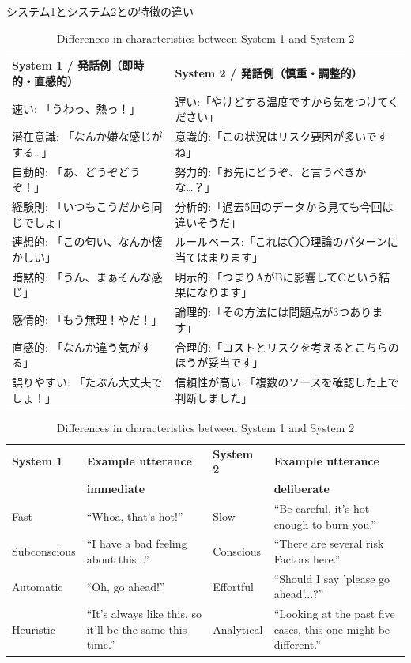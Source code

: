 \documentclass[a4paper,xelatex,ja=standard]{bxjsarticle}
\begin{document}
\begin{table}[htb]\centering\small
\ifJPN
\caption{システム1とシステム2との特徴の違い}
\else
\caption{Differences in characteristics between System 1 and System 2}
\fi
\label{tab:system1-system2}
\ifJPN
\toprule
\begin{tabular}{@{}ll@{}}
\textbf{System 1} / \textbf{発話例（即時的・直感的）} & \textbf{System 2} / \textbf{発話例（慎重・調整的）} \\
\midrule
速い: 「うわっ、熱っ！」 & 遅い:「やけどする温度ですから気をつけてください」 \\
潜在意識: 「なんか嫌な感じがする…」 & 意識的:「この状況はリスク要因が多いですね」 \\
自動的: 「あ、どうぞどうぞ！」 & 努力的:「お先にどうぞ、と言うべきかな…？」 \\
経験則: 「いつもこうだから同じでしょ」 & 分析的:「過去5回のデータから見ても今回は違いそうだ」 \\
連想的: 「この匂い、なんか懐かしい」 & ルールベース:「これは〇〇理論のパターンに当てはまります」 \\
暗黙的: 「うん、まぁそんな感じ」 & 明示的:「つまりAがBに影響してCという結果になります」 \\
感情的: 「もう無理！やだ！」 & 論理的:「その方法には問題点が3つあります」 \\
直感的: 「なんか違う気がする」 & 合理的:「コストとリスクを考えるとこちらのほうが妥当です」 \\
誤りやすい: 「たぶん大丈夫でしょ！」 & 信頼性が高い:「複数のソースを確認した上で判断しました」 \\
\end{tabular}
\else
\begin{tabular}{@{}lp{50mm}lp{60mm}@{}}
\toprule
\textbf{System 1} & \textbf{Example utterance } & \textbf{System 2} & \textbf{Example utterance} \\
& \textbf{immediate} & & \textbf{deliberate} \\
\midrule
Fast& ``Whoa, that's hot!'' & Slow& ``Be careful, it's hot enough to burn you.'' \\
Subconscious& ``I have a bad feeling about this...'' & Conscious& ``There are several risk Factors here.'' \\
Automatic& ``Oh, go ahead!'' & Effortful& ``Should I say 'please go ahead'...?'' \\
Heuristic& ``It's always like this, so it'll be the same this time.'' & Analytical& ``Looking at the past five cases, this one might be different.'' \\

\end{tabular}
\end{table}
\end{document}

